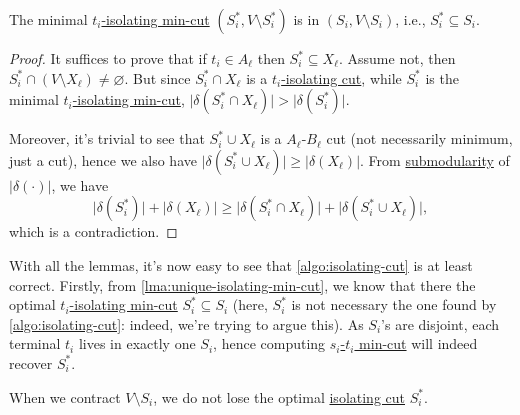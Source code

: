 \begin{lemma}\label{lma:unique-isolating-min-cut}
	The minimal \hyperref[prb:isolating-cut]{\(t_i\)-isolating min-cut} \((S_i^{\ast} , V \setminus S_i^{\ast} )\) is in \((S_i, V\setminus S_i)\), i.e., \(S_i^{\ast} \subseteq S_i\).
\end{lemma}
\begin{proof}
	It suffices to prove that if \(t_i \in A_{\ell } \) then \(S_i^{\ast} \subseteq X_{\ell } \). Assume not, then \(S_i^{\ast} \cap (V\setminus X_{\ell } ) \neq \varnothing \). But since \(S_i^{\ast} \cap X_{\ell } \) is a \hyperref[prb:isolating-cut]{\(t_i\)-isolating cut}, while \(S_i^{\ast} \) is the minimal \hyperref[prb:isolating-cut]{\(t_i\)-isolating min-cut}, \(\lvert \delta (S_i^{\ast} \cap X_{\ell } ) \rvert > \lvert \delta (S_i^{\ast} ) \rvert \).

	Moreover, it's trivial to see that \(S_i^{\ast} \cup X_{\ell } \) is a \(A_{\ell } \)-\(B_{\ell } \) cut (not necessarily minimum, just a cut), hence we also have \(\lvert \delta (S_i^{\ast} \cup X_{\ell } ) \rvert \geq \lvert \delta (X_{\ell } ) \rvert \). From \hyperref[def:submodular]{submodularity} of \(\lvert \delta (\cdot) \rvert \), we have
	\[
		\lvert \delta (S_i^{\ast} ) \rvert + \lvert \delta (X_{\ell } ) \rvert
		\geq \lvert \delta (S_i^{\ast} \cap X_{\ell } ) \rvert + \lvert \delta (S_i^{\ast} \cup X_{\ell } ) \rvert,
	\]
	which is a contradiction.
\end{proof}

With all the lemmas, it's now easy to see that \autoref{algo:isolating-cut} is at least correct. Firstly, from \autoref{lma:unique-isolating-min-cut}, we know that there the optimal \hyperref[prb:isolating-cut]{\(t_i\)-isolating min-cut} \(S_i^{\ast} \subseteq S_i\) (here, \(S_i^{\ast} \) is not necessary the one found by \autoref{algo:isolating-cut}: indeed, we're trying to argue this). As \(S_i\)'s are disjoint, each terminal \(t_i\) lives in exactly one \(S_i\), hence computing \hyperref[prb:s-t-min-cut]{\(s_i\)-\(t_i\) min-cut} will indeed recover \(S_i^{\ast} \).

\begin{intuition}
	When we contract \(V \setminus S_i\), we do not lose the optimal \hyperref[prb:isolating-cut]{isolating cut} \(S_i^{\ast} \).
\end{intuition}

